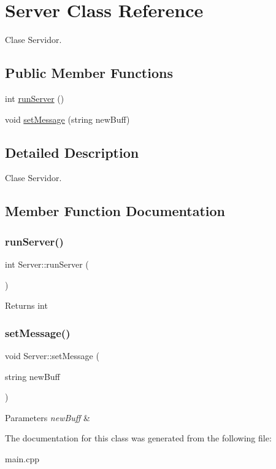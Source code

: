 \hypertarget{classServer}{}\section{Server Class Reference}
\label{classServer}


Clase Servidor.  


\subsection*{Public Member Functions}
\begin{DoxyCompactItemize}
\item 
int \hyperlink{classServer_af249050297cbdafc5fb2dbf6c009a6d3}{run\+Server} ()
\item 
void \hyperlink{classServer_ad60108ddf8e1d6d77afd1894d5361942}{set\+Message} (string new\+Buff)
\end{DoxyCompactItemize}


\subsection{Detailed Description}
Clase Servidor. 

\subsection{Member Function Documentation}
\mbox{\label{classServer_af249050297cbdafc5fb2dbf6c009a6d3}} 
\subsubsection{\texorpdfstring{run\+Server()}{runServer()}}
{\footnotesize\ttfamily int Server\+::run\+Server (\begin{DoxyParamCaption}{ }\end{DoxyParamCaption})\hspace{0.3cm}{\ttfamily [inline]}}

\begin{DoxyReturn}{Returns}
int 
\end{DoxyReturn}
\mbox{\label{classServer_ad60108ddf8e1d6d77afd1894d5361942}} 
\subsubsection{\texorpdfstring{set\+Message()}{setMessage()}}
{\footnotesize\ttfamily void Server\+::set\+Message (\begin{DoxyParamCaption}\item[{string}]{new\+Buff }\end{DoxyParamCaption})\hspace{0.3cm}{\ttfamily [inline]}}


\begin{DoxyParams}{Parameters}
{\em new\+Buff} & \\
\hline
\end{DoxyParams}


The documentation for this class was generated from the following file\+:\begin{DoxyCompactItemize}
\item 
main.\+cpp\end{DoxyCompactItemize}
